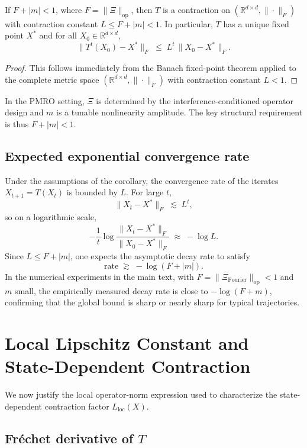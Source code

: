 \documentclass[11pt]{article}
\begin{document}
\begin{corollary}
If $F+|m| < 1$, where $F=\|\Xi\|_{\mathrm{op}}$, then $T$ is a contraction on $(\mathbb{R}^{d\times d},\|\cdot\|_F)$ with contraction constant $L\le F+|m|<1$. In particular, $T$ has a unique fixed point $X^*$ and for all $X_0\in\mathbb{R}^{d\times d}$,
\[
  \|T^t(X_0)-X^*\|_F \;\leq\; L^t\,\|X_0 - X^*\|_F.
\]
\end{corollary}

\begin{proof}
This follows immediately from the Banach fixed-point theorem applied to the complete metric space $(\mathbb{R}^{d\times d},\|\cdot\|_F)$ with contraction constant $L<1$.
\end{proof}

In the PMRO setting, $\Xi$ is determined by the interference-conditioned operator design and $m$ is a tunable nonlinearity amplitude. The key structural requirement is thus $F+|m|<1$.

\subsection{Expected exponential convergence rate}

Under the assumptions of the corollary, the convergence rate of the iterates $X_{t+1}=T(X_t)$ is bounded by $L$. For large $t$,
\[
  \|X_t - X^*\|_F \;\lesssim\; L^t,
\]
so on a logarithmic scale,
\[
  -\frac{1}{t}\log\frac{\|X_t-X^*\|_F}{\|X_0-X^*\|_F}
  \;\approx\; -\log L.
\]
Since $L\le F+|m|$, one expects the asymptotic decay rate to satisfy
\[
  \text{rate} \;\gtrsim\; -\log(F+|m|).
\]
In the numerical experiments in the main text, with $F=\|\Xi_{\mathrm{Fourier}}\|_{\mathrm{op}}<1$ and $m$ small, the empirically measured decay rate is close to $-\log(F+m)$, confirming that the global bound is sharp or nearly sharp for typical trajectories.

\section{Local Lipschitz Constant and State-Dependent Contraction}

We now justify the local operator-norm expression used to characterize the state-dependent contraction factor $L_{\mathrm{loc}}(X)$.

\subsection{Fr\'echet derivative of $T$}
\end{document}
